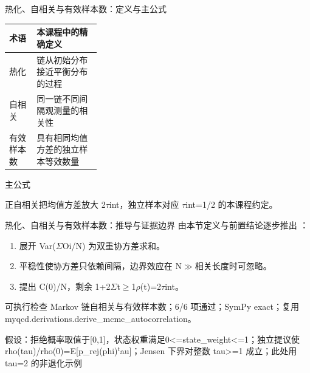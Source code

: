 \begin{frame}[t]{热化、自相关与有效样本数：定义与主公式}
\footnotesize\begin{tabularx}{\linewidth}{p{0.30\linewidth}Y}
\toprule 术语 & 本课程中的精确定义\\\midrule
{} 热化 & 链从初始分布接近平衡分布的过程\\
 自相关 & 同一链不同间隔观测量的相关性\\
 有效样本数 & 具有相同均值方差的独立样本等效数量\\
\bottomrule\end{tabularx}\vspace{0.15cm}
\begin{block}{ 主公式}\centering{}\end{block}
正自相关把均值方差放大 2\ensuremath{\tau}int，独立样本对应 \ensuremath{\tau}int=1/\allowbreak{}2 的本课程约定。
\end{frame}

\begin{frame}[t]{热化、自相关与有效样本数：推导与证据边界}
\footnotesize
{}\quad 由本节定义与前置结论逐步推出 ：
\begin{enumerate}
\item 展开 Var(\ensuremath{\Sigma}Oi/\allowbreak{}N) 为双重协方差求和。
\item 平稳性使协方差只依赖间隔，边界效应在 N\ensuremath{\gg}相关长度时可忽略。
\item 提出 C(0)/\allowbreak{}N，剩余 1+2\ensuremath{\Sigma}t\ensuremath{\ge}1\ensuremath{\rho}(t)=2\ensuremath{\tau}int。
\end{enumerate}\begin{block}{可执行检查}
\quad Markov 链自相关与有效样本数；6/6 项通过；SymPy exact；复用 myqcd.derivations.derive\_mcmc\_autocorrelation。
\par\scriptsize 假设：拒绝概率取值于[0,1]，状态权重满足0<=state\_weight<=1；独立提议使 rho(tau)/\allowbreak{}rho(0)=E[p\_rej(phi)\ensuremath{^{t}}au]；Jensen 下界对整数 tau>=1 成立；此处用 tau=2 的非退化示例
\end{block}
\end{frame}

